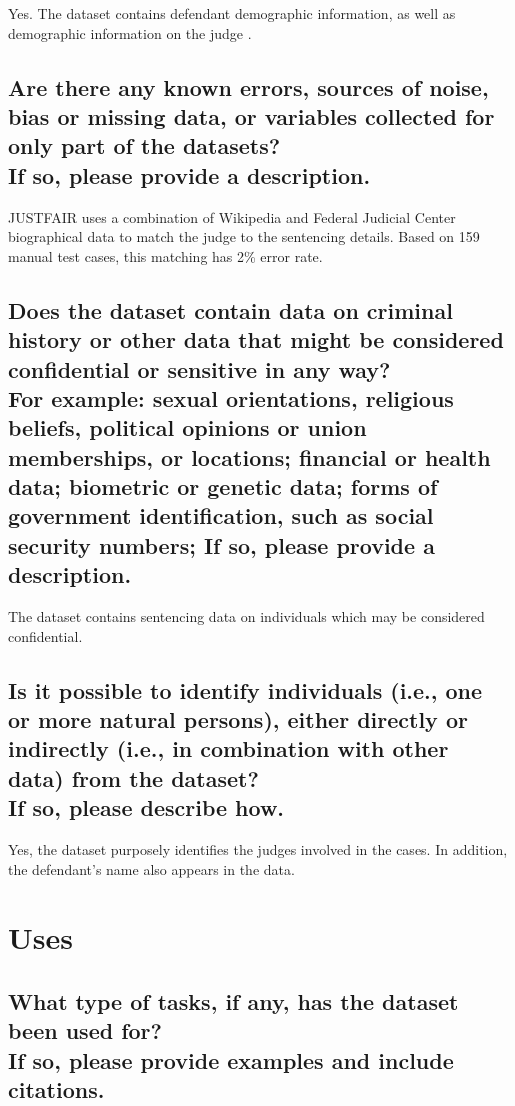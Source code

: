 \documentclass[letterpaper, 10 pt, conference]{ieeeconf}  %
\newcommand{\subtitle}[1]{{\\ \small \normalfont \color{purple} #1}}
\begin{document}
Yes. The dataset contains defendant demographic information, as well as demographic information on the judge .

\subsection{Are there any known errors, sources of noise, bias or missing data, or variables collected for only part of the datasets? \subtitle{If so, please provide a description.}}

JUSTFAIR uses a combination of Wikipedia and Federal Judicial Center biographical data to match the judge to the sentencing details. Based on 159 manual test cases, this matching has 2\% error rate.

\subsection{Does the dataset contain data on criminal history or other data that might be considered confidential or sensitive in any way? \subtitle{For example: sexual orientations, religious beliefs, political opinions or union memberships, or locations; financial or health data; biometric or genetic data; forms of government identification, such as social security numbers; If so, please provide a description.}}

The dataset contains sentencing data on individuals which may be considered confidential. 

\subsection{Is it possible to identify individuals (i.e., one or more natural persons), either directly or indirectly (i.e., in combination with other data) from the dataset? \subtitle{If so, please describe how.}}

Yes, the dataset purposely identifies the judges involved in the cases. In addition, the defendant's name also appears in the data.

\section{Uses}

\subsection{What type of tasks, if any, has the dataset been used for? \subtitle{If so, please provide examples and include citations.}}
\end{document}
